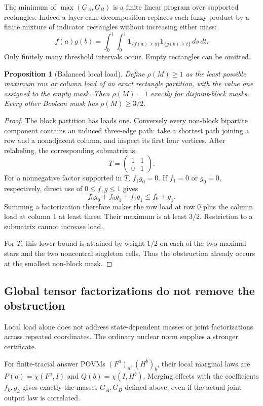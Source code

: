 \documentclass[11pt,reqno]{amsart}
\numberwithin{equation}{section}
\newtheorem{proposition}[theorem]{Proposition}
\theoremstyle{definition}
\theoremstyle{remark}
\newcommand{\one}{\mathbf1}
\begin{document}
The minimum of \(\max(G_A,G_B)\) is a finite linear program over supported rectangles. Indeed a layer-cake decomposition replaces each fuzzy product by a finite mixture of indicator rectangles without increasing either mass:
\[
 f(a)g(b)=\int_0^1\int_0^1
      \one_{\{f(a)\ge s\}}\one_{\{g(b)\ge t\}}\,ds\,dt.
\]
Only finitely many threshold intervals occur. Empty rectangles can be omitted.

\begin{proposition}[Balanced local load]\label{prop:loadone}
Define \(\rho(M)\ge1\) as the least possible maximum row or column load of an exact rectangle partition, with the value one assigned to the empty mask. Then \(\rho(M)=1\) exactly for disjoint-block masks. Every other Boolean mask has \(\rho(M)\ge3/2\).
\end{proposition}
\begin{proof}
The block partition has loads one. Conversely every non-block bipartite component contains an induced three-edge path: take a shortest path joining a row and a nonadjacent column, and inspect its first four vertices. After relabeling, the corresponding submatrix is
\[
 T=\begin{pmatrix}1&1\\0&1\end{pmatrix}.
\]
For a nonnegative factor supported in \(T\), \(f_1g_0=0\). If \(f_1=0\) or \(g_0=0\), respectively, direct use of \(0\le f,g\le1\) gives
\[
 f_0g_0+f_0g_1+f_1g_1\le f_0+g_1.
\]
Summing a factorization therefore makes the row load at row \(0\) plus the column load at column \(1\) at least three. Their maximum is at least \(3/2\). Restriction to a submatrix cannot increase load.

For \(T\), this lower bound is attained by weight \(1/2\) on each of the two maximal stars and the two noncentral singleton cells. Thus the obstruction already occurs at the smallest non-block mask.
\end{proof}

\subsection{Global tensor factorizations do not remove the obstruction}
Local load alone does not address state-dependent masses or joint factorizations across repeated coordinates. The ordinary nuclear norm supplies a stronger certificate.

For finite-tracial answer POVMs \((F^a)_a,(H^b)_b\), their local marginal laws are \(P(a)=\chi(F^a,I)\) and \(Q(b)=\chi(I,H^b)\). Merging effects with the coefficients \(f_k,g_k\) gives exactly the masses \(G_A,G_B\) defined above, even if the actual joint output law is correlated.
\end{document}
